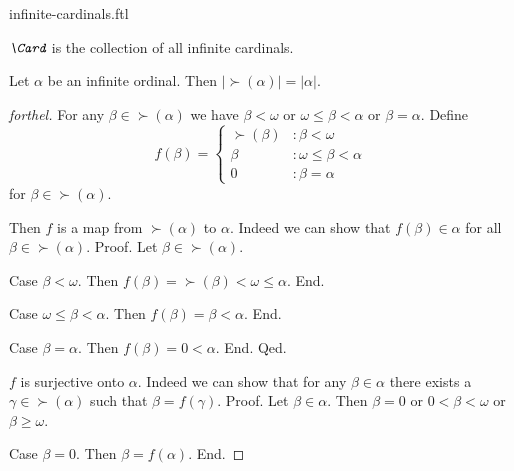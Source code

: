\documentclass{naproche-library}
\begin{document}
\begin{smodule}[title=Infinite Cardinal Numbers]{infinite-cardinals.ftl}

\begin{definition}[forthel,id=SET_THEORY_07_4231078585827328]
  $\emph{\Card}$ is the collection of all infinite cardinals.
\end{definition}

\begin{proposition}[forthel,id=SET_THEORY_07_8189062544359424]
  Let $\alpha$ be an infinite ordinal.
  Then $|\succ(\alpha)| = |\alpha|$.
\end{proposition}
\begin{proof}[forthel]
  For any $\beta \in \succ(\alpha)$ we have
  $\beta < \omega$ or $\omega \leq \beta < \alpha$ or $\beta = \alpha$.
  Define \[ f(\beta) =
    \begin{cases}
      \succ(\beta)  & : \beta < \omega
      \\
      \beta         & : \omega \leq \beta < \alpha
      \\
      0             & : \beta = \alpha
    \end{cases} \]
  for $\beta \in \succ(\alpha)$.

  Then $f$ is a map from $\succ(\alpha)$ to $\alpha$.
  Indeed we can show that $f(\beta) \in \alpha$ for all
  $\beta \in \succ(\alpha)$. \newline
  Proof.
    Let $\beta \in \succ(\alpha)$.

    Case $\beta < \omega$.
      Then $f(\beta)
        = \succ(\beta)
        < \omega
        \leq \alpha$.
    End.

    Case $\omega \leq \beta < \alpha$.
      Then $f(\beta)
        = \beta
        < \alpha$.
    End.

    Case $\beta = \alpha$.
      Then $f(\beta)
        = 0
        < \alpha$.
    End.
  Qed.

  $f$ is surjective onto $\alpha$.
  Indeed we can show that for any $\beta \in \alpha$ there exists a
  $\gamma \in \succ(\alpha)$ such that $\beta = f(\gamma)$. \newline
  Proof.
    Let $\beta \in \alpha$.
    Then $\beta = 0$ or $0 < \beta < \omega$ or $\beta \geq \omega$.

    Case $\beta = 0$.
      Then $\beta = f(\alpha)$.
    End.


\end{proof}
\end{smodule}
\end{document}
